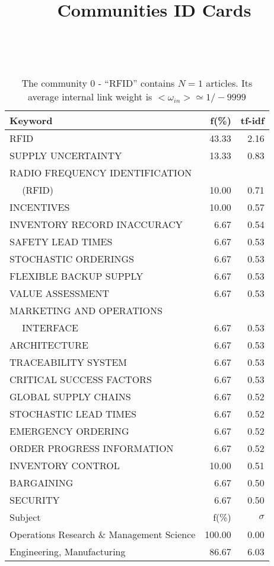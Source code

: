 \documentclass[a4paper,11pt]{report}
\title{{\bf Communities ID Cards}}
\date{\begin{flushleft}This document gather the ``ID Cards'' of the CC communities found within your database.\\
 The CC network was built by keeping a link between articles sharing at least 5 references. The communities characterized here correspond to the ones found in the level 0 (in the sense of the Louvain algo) which gathers more than 0 articles.\\
 These ID cards displays the most frequent keywords, subject categories, journals of publication, institution, countries, authors, references and reference journals of the articles of each community. The significance of an item $\sigma = \sqrt{N} (f - p) / \sqrt{p(1-p)}$ [where $N$ is the number of articles within the community and $f$ and $p$ are the proportion of articles respectively within the community and within the database displaying that item ] is also given (for example $\sigma > 5$ is really highly significant). The tf-idf value which can be calculated by $tf-idf = f*log(frac{1}{p})$ is also given.\\
\vspace{1cm}
\copyright Sebastian Grauwin, Liu Weizhi - (2014) \end{flushleft}}
\begin{document}
\begin{landscape}
\maketitle
\clearpage

\begin{table}[!ht]
\caption{The community 0 - ``RFID'' contains $N = 1$ articles. Its average internal link weight is $<\omega_{in}> \simeq 1/-9999$ }
\textcolor{white}{aa}\\
{\scriptsize\begin{tabular}{|l r  r|}
\hline
Keyword & f(\%) & tf-idf \\
\hline
RFID & 43.33 & 2.16\\
SUPPLY UNCERTAINTY & 13.33 & 0.83\\
RADIO FREQUENCY IDENTIFICATION &  &\\
$\quad$ (RFID) & 10.00 & 0.71\\
INCENTIVES & 10.00 & 0.57\\
INVENTORY RECORD INACCURACY & 6.67 & 0.54\\
SAFETY LEAD TIMES & 6.67 & 0.53\\
STOCHASTIC ORDERINGS & 6.67 & 0.53\\
FLEXIBLE BACKUP SUPPLY & 6.67 & 0.53\\
VALUE ASSESSMENT & 6.67 & 0.53\\
MARKETING AND OPERATIONS &  &\\
$\quad$ INTERFACE & 6.67 & 0.53\\
ARCHITECTURE & 6.67 & 0.53\\
TRACEABILITY SYSTEM & 6.67 & 0.53\\
CRITICAL SUCCESS FACTORS & 6.67 & 0.53\\
GLOBAL SUPPLY CHAINS & 6.67 & 0.52\\
STOCHASTIC LEAD TIMES & 6.67 & 0.52\\
EMERGENCY ORDERING & 6.67 & 0.52\\
ORDER PROGRESS INFORMATION & 6.67 & 0.52\\
INVENTORY CONTROL & 10.00 & 0.51\\
BARGAINING & 6.67 & 0.50\\
SECURITY & 6.67 & 0.50\\
\hline
\hline
Subject & f(\%) & $\sigma$\\
\hline
Operations Research \& Management Science & 100.00 & 0.00\\
Engineering, Manufacturing & 86.67 & 6.03\\

\end{tabular}}
\end{table}
\end{landscape}
\end{document}
